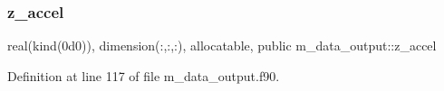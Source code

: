 \mbox{\label{namespacem__data__output_aef4cabc25090173d5817782631af2781}} 
\subsubsection{\texorpdfstring{z\+\_\+accel}{z\_accel}}
{\footnotesize\ttfamily real(kind(0d0)), dimension(\+:,\+:,\+:), allocatable, public m\+\_\+data\+\_\+output\+::z\+\_\+accel}



Definition at line 117 of file m\+\_\+data\+\_\+output.\+f90.

